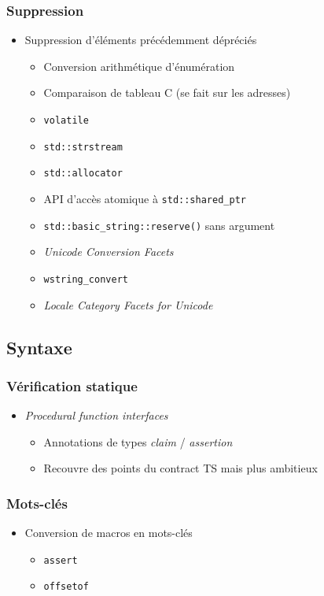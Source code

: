 \documentclass[C++.tex]{subfiles}
\begin{document}
\begin{frame}[fragile]
	\frametitle{Suppression}
	\begin{itemize}
		\item Suppression d'éléments précédemment dépréciés
		\begin{itemize}
			\item Conversion arithmétique d'énumération
			\item Comparaison de tableau C (se fait sur les adresses)
			\item \lstinline|volatile|
			\item \lstinline|std::strstream|
			\item \lstinline|std::allocator|
			\item API d'accès atomique à \lstinline|std::shared_ptr|
			\item \lstinline|std::basic_string::reserve()| sans argument
			\item \textit{Unicode Conversion Facets}
			\item \lstinline|wstring_convert|
			\item \textit{Locale Category Facets for Unicode}
		\end{itemize}
	\end{itemize}
\end{frame}

\subsection*{Syntaxe}
\begin{frame}[fragile]
	\frametitle{Vérification statique}
	\begin{itemize}
		\item \textit{Procedural function interfaces} 
		\begin{itemize}
			\item Annotations de types \textit{claim} / \textit{assertion}
			\item Recouvre des points du contract TS mais plus ambitieux
		\end{itemize}
	\end{itemize}
\end{frame}

\begin{frame}[fragile]
	\frametitle{Mots-clés}
	\begin{itemize}
		\item Conversion de macros en mots-clés


		\begin{itemize}
			\item \lstinline|assert|
			\item \lstinline|offsetof|
		\end{itemize}
	\end{itemize}
\end{frame}
\end{document}
